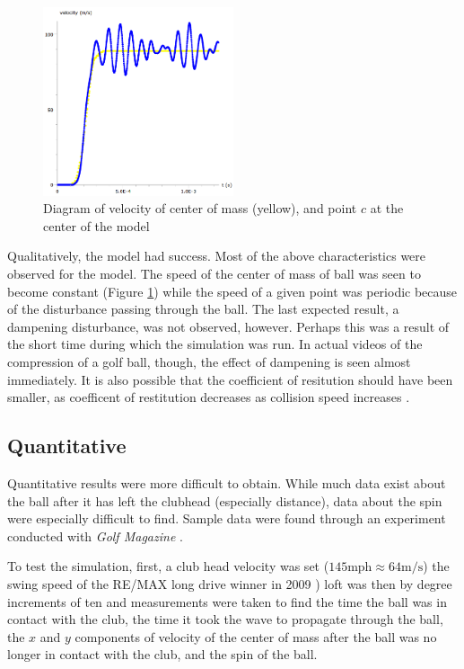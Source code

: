 \documentclass{article}
\begin{document}
\begin{figure}[h]
\centering
\includegraphics[width = 0.5\textwidth]{velocity_40.png}
\caption{Diagram of velocity of center of mass (yellow), and point $c$ at the center of the model}
\label{fig:velocity40}
\end{figure}

Qualitatively, the model had success. Most of the above characteristics were observed for the model. The speed of the center of mass of ball was seen to become constant (Figure \ref{fig:velocity40}) while the speed of a given point was periodic because of the disturbance passing through the ball. The last expected result, a dampening disturbance, was not observed, however. Perhaps this was a result of the short time during which the simulation was run. In actual videos of the compression of a golf ball, though, the ef\mbox{f}ect of dampening is seen almost immediately. It is also possible that the coef\mbox{f}icient of resitution should have been smaller, as coef\mbox{f}icent of restitution decreases as collision speed increases \cite{decreasing}.

\subsection{Quantitative}
Quantitative results were more dif\mbox{f}icult to obtain. While much data exist about the ball after it has left the clubhead (especially distance), data about the spin were especially dif\mbox{f}icult to find. Sample data were found through an experiment conducted with \textit{Golf Magazine} \cite{spin}.

To test the simulation, first, a club head velocity was set ($145 \text{mph} \approx 64 \text{m/s}$) the swing speed of the RE/MAX long drive winner in 2009 \cite{trackman}) loft was then by degree increments of ten and measurements were taken to find the time the ball was in contact with the club, the time it took the wave to propagate through the ball, the $x$ and $y$ components of velocity of the center of mass after the ball was no longer in contact with the club, and the spin of the ball.
\end{document}
